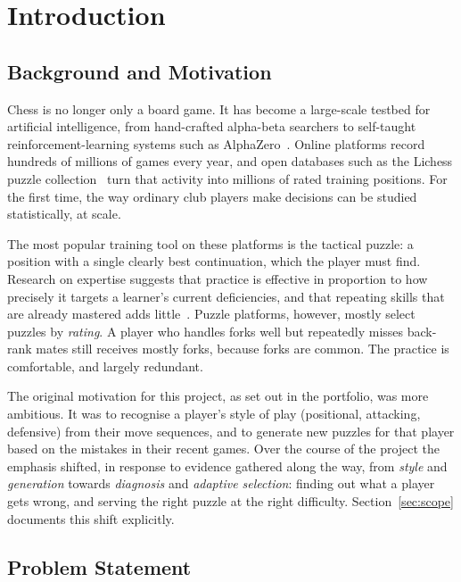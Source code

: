 \chapter{Introduction}\label{ch:intro}

\section{Background and Motivation}

Chess is no longer only a board game. It has become a large-scale testbed for artificial
intelligence, from hand-crafted alpha-beta searchers to self-taught reinforcement-learning systems
such as AlphaZero~\cite{silver2018general}. Online platforms record hundreds of millions of games
every year, and open databases such as the Lichess puzzle collection~\cite{lichessdb} turn that
activity into millions of rated training positions. For the first time, the way ordinary club
players make decisions can be studied statistically, at scale.

The most popular training tool on these platforms is the tactical puzzle: a position with a single
clearly best continuation, which the player must find. Research on expertise suggests that practice
is effective in proportion to how precisely it targets a learner's current deficiencies, and that
repeating skills that are already mastered adds little~\cite{ericsson1993role}. Puzzle platforms,
however, mostly select puzzles by \emph{rating}. A player who handles forks well but repeatedly
misses back-rank mates still receives mostly forks, because forks are common. The practice is
comfortable, and largely redundant.

The original motivation for this project, as set out in the portfolio, was more ambitious. It was to
recognise a player's style of play (positional, attacking, defensive) from their move sequences,
and to generate new puzzles for that player based on the mistakes in their recent games. Over the
course of the project the emphasis shifted, in response to evidence gathered along the way, from
\emph{style} and \emph{generation} towards \emph{diagnosis} and \emph{adaptive selection}: finding
out what a player gets wrong, and serving the right puzzle at the right difficulty.
Section~\ref{sec:scope} documents this shift explicitly.

\section{Problem Statement}


